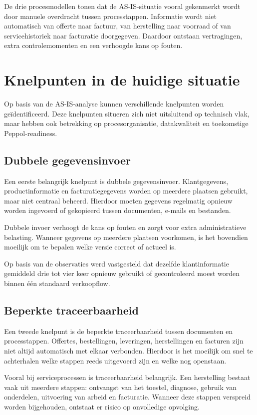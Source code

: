 De drie procesmodellen tonen dat de AS-IS-situatie vooral gekenmerkt wordt door manuele overdracht tussen processtappen. Informatie wordt niet automatisch van offerte naar factuur, van herstelling naar voorraad of van servicehistoriek naar facturatie doorgegeven. Daardoor ontstaan vertragingen, extra controlemomenten en een verhoogde kans op fouten.

\section{Knelpunten in de huidige situatie}
\label{sec:knelpunten}

Op basis van de AS-IS-analyse kunnen verschillende knelpunten worden geïdentificeerd. Deze knelpunten situeren zich niet uitsluitend op technisch vlak, maar hebben ook betrekking op procesorganisatie, datakwaliteit en toekomstige Peppol-readiness.

\subsection{Dubbele gegevensinvoer}

Een eerste belangrijk knelpunt is dubbele gegevensinvoer. Klantgegevens, productinformatie en facturatiegegevens worden op meerdere plaatsen gebruikt, maar niet centraal beheerd. Hierdoor moeten gegevens regelmatig opnieuw worden ingevoerd of gekopieerd tussen documenten, e-mails en bestanden.

Dubbele invoer verhoogt de kans op fouten en zorgt voor extra administratieve belasting. Wanneer gegevens op meerdere plaatsen voorkomen, is het bovendien moeilijk om te bepalen welke versie correct of actueel is.

Op basis van de observaties werd vastgesteld dat dezelfde klantinformatie gemiddeld drie tot vier keer opnieuw gebruikt of gecontroleerd moest worden binnen één standaard verkoopflow.

\subsection{Beperkte traceerbaarheid}

Een tweede knelpunt is de beperkte traceerbaarheid tussen documenten en processtappen. Offertes, bestellingen, leveringen, herstellingen en facturen zijn niet altijd automatisch met elkaar verbonden. Hierdoor is het moeilijk om snel te achterhalen welke stappen reeds uitgevoerd zijn en welke nog openstaan.

Vooral bij serviceprocessen is traceerbaarheid belangrijk. Een herstelling bestaat vaak uit meerdere stappen: ontvangst van het toestel, diagnose, gebruik van onderdelen, uitvoering van arbeid en facturatie. Wanneer deze stappen verspreid worden bijgehouden, ontstaat er risico op onvolledige opvolging.

